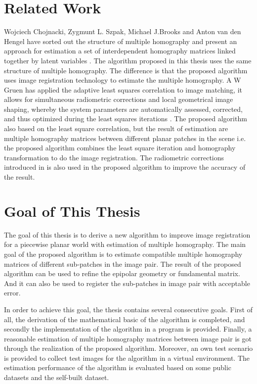 \section{Related Work}
Wojciech Chojnacki, Zygmunt L. Szpak, Michael J.Brooks and Anton van den Hengel have sorted out the structure of multiple homography and present an approach for estimation a set of interdependent homography matrices linked together by latent variables \cite{chojnackiEnforcingConsistencyConstraints2015} \cite{chojnackiMultipleHomographyEstimation2010}. The algorithm proposed in this thesis uses the same structure of multiple homography.  The difference is that the proposed algorithm uses image registration technology to estimate the multiple homography. A W Gruen has applied the adaptive least squares correlation to image matching, it allows for simultaneous radiometric corrections and local geometrical image shaping, whereby the system parameters are automatically assessed, corrected, and thus optimized during the least squares iterations \cite{gruenAdaptiveLeastSquares1985a}. The proposed algorithm also based on the least square correlation, but the result of  estimation are multiple homography matrices between different planar patches in the scene i.e. the proposed algorithm combines the least square iteration and homography transformation to do the image registration. The radiometric corrections introduced in \cite{gruenAdaptiveLeastSquares1985a} is also used in the proposed algorithm to improve the accuracy of the result.

\section{Goal of This Thesis}
The goal of this thesis is to derive a new algorithm to improve image registration for a piecewise planar world with estimation of multiple homography. The main goal of the proposed algorithm is to estimate compatible multiple homography matrices of different sub-patches in the image pair. The result of the proposed algorithm can be used to refine the epipolar geometry or fundamental matrix. And it can also be used to register the sub-patches in image pair with acceptable error. 

In order to achieve this goal, the thesis contains several consecutive goals. First of all, the derivation of the mathematical basic of the algorithm is completed, and secondly the implementation of the algorithm in a program is provided. Finally, a reasonable estimation of multiple homography matrices between image pair is got through the realization of the proposed algorithm. Moreover, an own test scenario is provided to collect test images for the algorithm in a virtual environment. The estimation performance of the algorithm is evaluated based on some public datasets and the self-built dataset.

